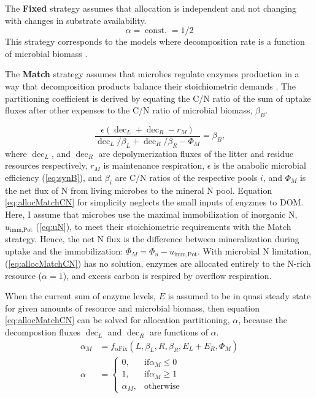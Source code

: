 The \textbf{Fixed} strategy assumes that allocation is independent
and not changing with changes in substrate availability.
\begin{equation} 
\label{eq:allocFixed}
\alpha = \operatorname{const.} = 1/2
\end{equation}
This strategy corresponds to the models where decomposition rate is a function
of microbial biomass \citep{Wutzler08}.
 
The \textbf{Match} strategy assumes that microbes regulate enzymes production in
a way that decomposition products balance their stoichiometric demands
\citep{Moorhead12}.
The partitioning coefficient is derived by equating the C/N ratio of the sum of
uptake fluxes after other expenses to the C/N ratio of microbial biomass,
$\beta_B$.

\begin{equation} 
\label{eq:allocMatchCN}
\frac{\epsilon (\operatorname{dec}_L + \operatorname{dec}_R - r_M)}{
\operatorname{dec}_L/\beta_L + \operatorname{dec}_R/\beta_R  - \Phi_M } =
\beta_B
\text{,}
\end{equation}
where $\operatorname{dec}_L$, and $\operatorname{dec}_R$ are depolymerization
fluxes of the litter and residue resources respectively, $r_M$ is maintenance
respiration, $\epsilon$ is the anabolic microbial efficiency (\ref{eq:synB}),
and $\beta_i$ are C/N ratios of the respective pools $i$, and $\Phi_M$ is the
net flux of N from living microbes to the mineral N pool. Equation
\ref{eq:allocMatchCN} for simplicity neglects the small inputs of enyzmes to DOM. Here, I assume that
microbes use the maximal immobilization of inorganic N, $u_{\operatorname{imm,Pot}}$ (\ref{eq:uN}), to meet their stoichiometric
requirements with the Match strategy. Hence, the net N flux is the difference
between mineralization during uptake and the immobilization: $\Phi_M = \Phi_u -
u_{\operatorname{imm,Pot}}$. With microbial N limitation,
(\ref{eq:allocMatchCN})  has no solution, enzymes are allocated entirely to
the N-rich resource ($\alpha=1$), and excess carbon is
respired by overflow respiration.

When the current sum of enzyme levels, $E$ is assumed to be in quasi
steady state for given amounts of resource and microbial biomass, then equation
\ref{eq:allocMatchCN} can be solved for allocation partitioning, $\alpha$,
because the decompostion fluxes $\operatorname{dec}_L$ and
$\operatorname{dec}_R$ are functions of $\alpha$.
\begin{subequations}
\label{eq:allocMatch} 
\begin{align}
\alpha_M &= f_{\operatorname{{\alpha}Fix}}(L,\beta_L,R,\beta_R, E_L + E_R,
\Phi_M)
\\
\alpha &= \begin{cases}
  0,  & \text{if} \alpha_M \le 0 \\
  1,  & \text{if} \alpha_M \ge 1 \\
  \alpha_M, & \text{otherwise}
\end{cases}   
\end{align}
\end{subequations} 

